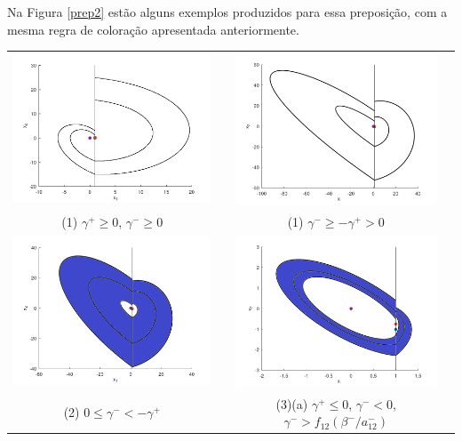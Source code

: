 Na Figura \ref{prep2} estão alguns exemplos produzidos para essa preposição, com a mesma regra de coloração apresentada anteriormente.
\begin{table}[H]
\centering
\begin{tabular}{cc}
\includegraphics[width=6cm]{2_1_1}
&
\includegraphics[width=6cm]{2_1_2}\\
\small(1) $\gamma^+\geq0$, $\gamma^-\geq0$&\small(1) $\gamma^-\geq-\gamma^+>0$\\
\includegraphics[width=6cm]{2_2}
&
\includegraphics[width=6cm]{2_3_a}\\
\small(2)  $0\leq\gamma^-<-\gamma^+$&\small (3)(a) $\gamma^+\leq0$, $\gamma^-<0$, $\gamma^->f_{12}(\beta^-/a^-_{12})$\\

\end{tabular}
\end{table}
